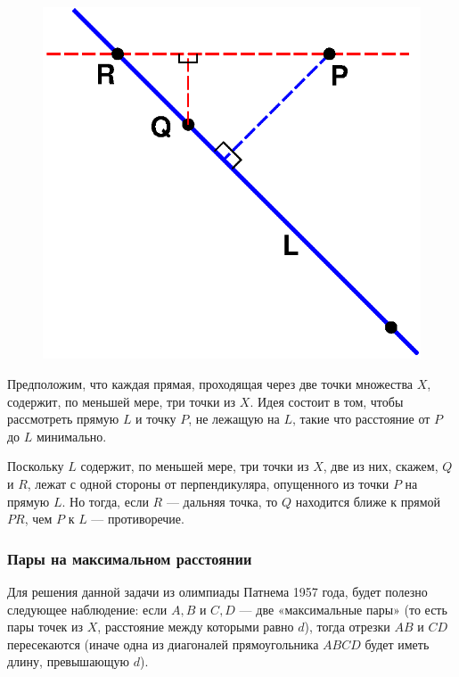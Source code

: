 \begin{figure}[h!]
\centering
\includegraphics[scale=0.7]{Figs/Geometry/kelly}
\end{figure}

Предположим, что каждая прямая, проходящая через две точки множества $X$, содержит, по меньшей мере, три точки из $X$.
Идея состоит в том, чтобы рассмотреть прямую $L$ и точку $P$, не лежащую на $L$, такие что расстояние от $P$ до $L$ минимально.

Поскольку $L$ содержит, по меньшей мере, три точки из $X$, две из них, скажем, $Q$ и $R$, лежат с одной стороны от перпендикуляра, опущенного из точки $P$ на прямую $L$.
Но тогда, если $R$ --- дальняя точка, то $Q$ находится ближе к прямой $PR$, чем $P$ к $L$ --- противоречие.\heart

\subsubsection*{Пары на максимальном расстоянии}%

Для решения данной задачи из олимпиады Патнема 1957 года, будет полезно следующее наблюдение: если $A,B$ и $C,D$ --- две «максимальные пары» (то есть пары точек из $X$, расстояние между которыми равно $d$), тогда отрезки $AB$ и $CD$ пересекаются (иначе одна из диагоналей прямоугольника $ABCD$ будет иметь длину, превышающую $d$).

